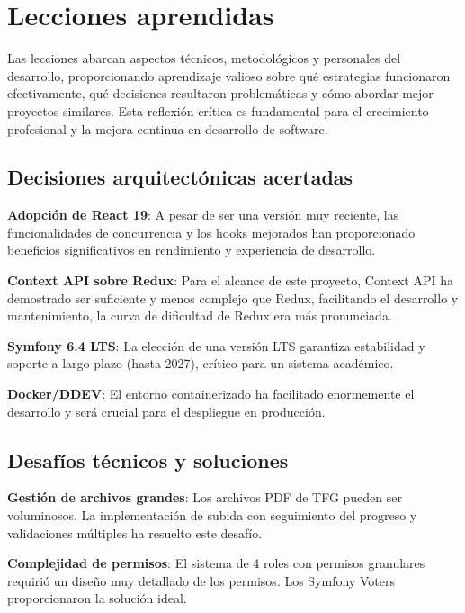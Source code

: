 \documentclass[12pt,a4paper,oneside]{report}
\begin{document}
\section{Lecciones aprendidas}\label{lecciones-aprendidas}

Las lecciones abarcan aspectos técnicos, metodológicos y personales del desarrollo, proporcionando aprendizaje valioso sobre qué estrategias funcionaron efectivamente, qué decisiones resultaron problemáticas y cómo abordar mejor proyectos similares. Esta reflexión crítica es fundamental para el crecimiento profesional y la mejora continua en desarrollo de software.

\subsection{Decisiones arquitectónicas
acertadas}\label{decisiones-arquitectuxf3nicas-acertadas}

\textbf{Adopción de React 19}: A pesar de ser una versión muy reciente,
las funcionalidades de concurrencia y los hooks mejorados han
proporcionado beneficios significativos en rendimiento y experiencia de
desarrollo.

\textbf{Context API sobre Redux}: Para el alcance de este proyecto,
Context API ha demostrado ser suficiente y menos complejo que Redux,
facilitando el desarrollo y mantenimiento, la curva de dificultad de Redux era más pronunciada.

\textbf{Symfony 6.4 LTS}: La elección de una versión LTS garantiza
estabilidad y soporte a largo plazo (hasta 2027), crítico para un sistema académico.

\textbf{Docker/DDEV}: El entorno containerizado ha facilitado
enormemente el desarrollo y será crucial para el despliegue en
producción.

\subsection{Desafíos técnicos y
soluciones}\label{desafuxedos-tuxe9cnicos-y-soluciones}

\textbf{Gestión de archivos grandes}: Los archivos PDF de TFG pueden ser
voluminosos. La implementación de subida con seguimiento del progreso y
validaciones múltiples ha resuelto este desafío.

\textbf{Complejidad de permisos}: El sistema de 4 roles con permisos
granulares requirió un diseño muy detallado de los permisos. Los Symfony Voters
proporcionaron la solución ideal.
\end{document}
